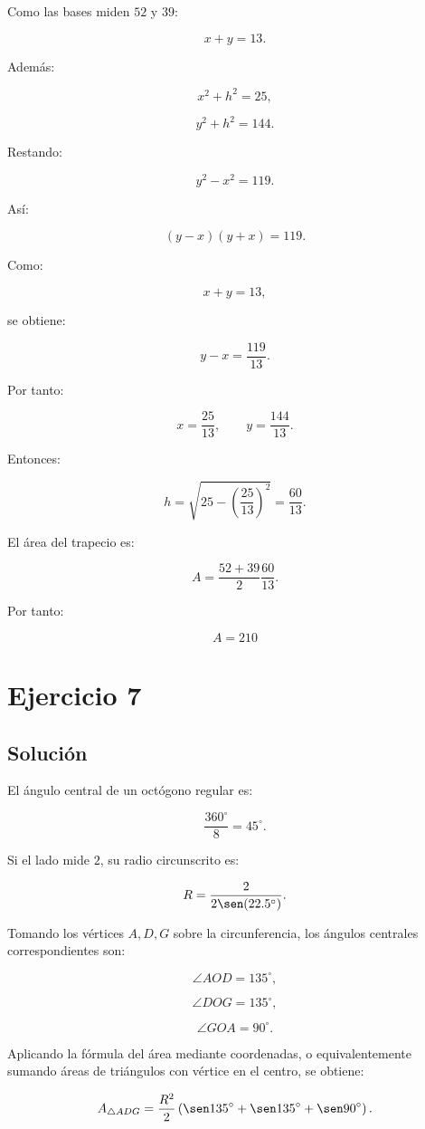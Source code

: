 \documentclass[11pt,a4paper]{article}
\begin{document}
Como las bases miden \(52\) y \(39\):

\[
x+y=13.
\]

Además:

\[
x^2+h^2=25,
\]

\[
y^2+h^2=144.
\]

Restando:

\[
y^2-x^2=119.
\]

Así:

\[
(y-x)(y+x)=119.
\]

Como:

\[
x+y=13,
\]

se obtiene:

\[
y-x=\frac{119}{13}.
\]

Por tanto:

\[
x=\frac{25}{13},
\qquad
y=\frac{144}{13}.
\]

Entonces:

\[
h
=
\sqrt{
25-\left(\frac{25}{13}\right)^2
}
=
\frac{60}{13}.
\]

El área del trapecio es:

\[
A
=
\frac{52+39}{2}
\frac{60}{13}.
\]

Por tanto:

\[
\boxed{A=210}
\]

\section{Ejercicio 7}
\subsection{Solución}

El ángulo central de un octógono regular es:

\[
\frac{360^\circ}{8}=45^\circ.
\]

Si el lado mide \(2\), su radio circunscrito es:

\[
R
=
\frac{2}{2\sen(22.5^\circ)}.
\]

Tomando los vértices \(A,D,G\) sobre la circunferencia, los ángulos centrales correspondientes son:

\[
\angle AOD=135^\circ,
\]

\[
\angle DOG=135^\circ,
\]

\[
\angle GOA=90^\circ.
\]

Aplicando la fórmula del área mediante coordenadas, o equivalentemente sumando áreas de triángulos con vértice en el centro, se obtiene:

\[
A_{\triangle ADG}
=
\frac{R^2}{2}
\left(
\sen135^\circ
+
\sen135^\circ
+
\sen90^\circ
\right).
\]
\end{document}

